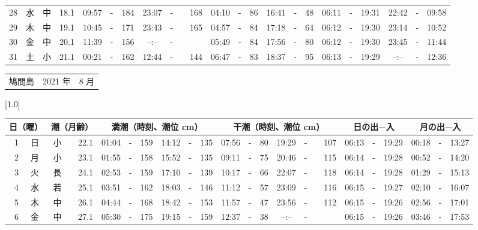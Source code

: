 \documentclass[12pt,a4j]{jsarticle}
\begin{document}
\begin{table}[htbp]
\begin{center}
{\begin{tabular}{|rc|cr|ccrccr|ccrccr|ccc|ccc|}
28 & 水 & 中 & 18.1 &  09:57 &-& 184 &  23:07 &-& 168 &  04:10 &-&  86 &  16:41 &-&  48 & 06:11 & -& 19:31 & 22:42 & -& 09:58 \\
29 & 木 & 中 & 19.1 &  10:45 &-& 171 &  23:43 &-& 165 &  04:57 &-&  84 &  17:18 &-&  64 & 06:12 & -& 19:30 & 23:14 & -& 10:52 \\
30 & 金 & 中 & 20.1 &  11:39 &-& 156 &  --:-- &-&~~~~~ &  05:49 &-&  84 &  17:56 &-&  80 & 06:12 & -& 19:30 & 23:45 & -& 11:44 \\
31 & 土 & 小 & 21.1 &  00:21 &-& 162 &  12:44 &-& 144 &  06:47 &-&  83 &  18:37 &-&  95 & 06:13 & -& 19:29 & --:-- & -& 12:36 \\
   \hline
   \end{tabular}}
   \end{center}
\end{table}
\newpage
 \begin{table}[htbp]
 \begin{center}
 \begin{tabular}{lcc}
 \LARGE{鳩間島}  & \large{2021 年} & \large{ 8 月} \\
 \end{tabular}
 \end{center}
 \begin{center}
    \scalebox{0.7}[1.0]{
    \begin{tabular}{|rc|cr|ccrccr|ccrccr|ccc|ccc|}
    \hline
    \multicolumn{2}{|c|}{日（曜）} & \multicolumn{2}{c|}{潮（月齢）} & \multicolumn{6}{c|}{満潮（時刻、潮位 cm）} & \multicolumn{6}{c|}{干潮（時刻、潮位 cm）} & \multicolumn{3}{c|}{日の出−入} &  \multicolumn{3}{c|}{月の出−入}\\
 \hline
 1 & 日 & 小 & 22.1 &  01:04 &-& 159 &  14:12 &-& 135 &  07:56 &-&  80 &  19:29 &-& 107 & 06:13 & -& 19:29 & 00:18 & -& 13:27 \\
 2 & 月 & 小 & 23.1 &  01:55 &-& 158 &  15:52 &-& 135 &  09:11 &-&  75 &  20:46 &-& 115 & 06:14 & -& 19:28 & 00:52 & -& 14:20 \\
 3 & 火 & 長 & 24.1 &  02:53 &-& 159 &  17:10 &-& 139 &  10:17 &-&  66 &  22:07 &-& 118 & 06:14 & -& 19:28 & 01:29 & -& 15:13 \\
 4 & 水 & 若 & 25.1 &  03:51 &-& 162 &  18:03 &-& 146 &  11:12 &-&  57 &  23:09 &-& 116 & 06:15 & -& 19:27 & 02:10 & -& 16:07 \\
 5 & 木 & 中 & 26.1 &  04:44 &-& 168 &  18:42 &-& 153 &  11:57 &-&  47 &  23:56 &-& 112 & 06:15 & -& 19:26 & 02:56 & -& 17:01 \\
 6 & 金 & 中 & 27.1 &  05:30 &-& 175 &  19:15 &-& 159 &  12:37 &-&  38 &  --:-- &-&~~~~~ & 06:15 & -& 19:26 & 03:46 & -& 17:53 \\

\end{tabular}}
\end{center}
\end{table}
\end{document}
